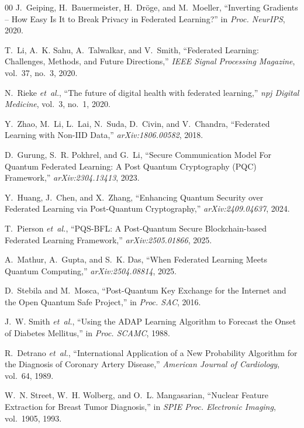 \documentclass[conference]{IEEEtran}
\begin{document}
\begin{thebibliography}{00}
J.~Geiping, H.~Bauermeister, H.~Dr{\"o}ge, and M.~Moeller,
``Inverting Gradients -- How Easy Is It to Break Privacy in
Federated Learning?'' in \emph{Proc. NeurIPS}, 2020.

T.~Li, A.~K. Sahu, A.~Talwalkar, and V.~Smith,
``Federated Learning: Challenges, Methods, and Future Directions,''
\emph{IEEE Signal Processing Magazine}, vol.~37, no.~3, 2020.

N.~Rieke \emph{et~al.},
``The future of digital health with federated learning,''
\emph{npj Digital Medicine}, vol.~3, no.~1, 2020.

Y.~Zhao, M.~Li, L.~Lai, N.~Suda, D.~Civin, and V.~Chandra,
``Federated Learning with Non-IID Data,''
\emph{arXiv:1806.00582}, 2018.

D.~Gurung, S.~R. Pokhrel, and G.~Li,
``Secure Communication Model For Quantum Federated Learning:
A Post Quantum Cryptography (PQC) Framework,''
\emph{arXiv:2304.13413}, 2023.

Y.~Huang, J.~Chen, and X.~Zhang,
``Enhancing Quantum Security over Federated Learning via
Post-Quantum Cryptography,''
\emph{arXiv:2409.04637}, 2024.

T.~Pierson \emph{et~al.},
``PQS-BFL: A Post-Quantum Secure Blockchain-based Federated
Learning Framework,''
\emph{arXiv:2505.01866}, 2025.

A.~Mathur, A.~Gupta, and S.~K. Das,
``When Federated Learning Meets Quantum Computing,''
\emph{arXiv:2504.08814}, 2025.

D.~Stebila and M.~Mosca,
``Post-Quantum Key Exchange for the Internet and the Open Quantum Safe
Project,'' in \emph{Proc. SAC}, 2016.

J.~W. Smith \emph{et~al.},
``Using the ADAP Learning Algorithm to Forecast the Onset of Diabetes
Mellitus,'' in \emph{Proc. SCAMC}, 1988.

R.~Detrano \emph{et~al.},
``International Application of a New Probability Algorithm for the
Diagnosis of Coronary Artery Disease,''
\emph{American Journal of Cardiology}, vol.~64, 1989.

W.~N. Street, W.~H. Wolberg, and O.~L. Mangasarian,
``Nuclear Feature Extraction for Breast Tumor Diagnosis,''
in \emph{SPIE Proc. Electronic Imaging}, vol.~1905, 1993.

\end{thebibliography}
\end{document}
